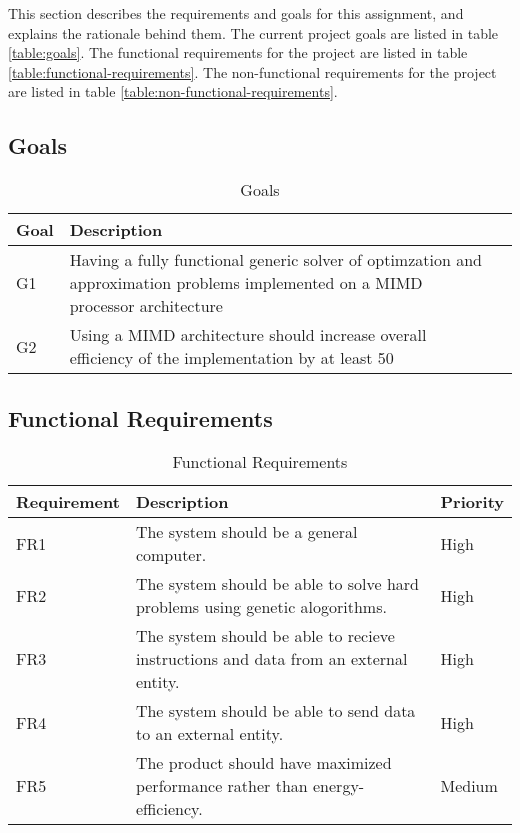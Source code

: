 This section describes the requirements and goals for this assignment, and explains the rationale behind them.
The current project goals are listed in table \vref{table:goals}.
The functional requirements for the project are listed in table \vref{table:functional-requirements}.
The non-functional requirements for the project are listed in table \vref{table:non-functional-requirements}.
\subsection{Goals}
\begin{table}[H]
 \begin{center}
 \begin{tabular}{| l | p{7cm} | l |}
 \hline
 Goal& Description\\
 \hline
 G1 & Having a fully functional generic solver of optimzation and approximation problems implemented on a MIMD processor architecture  \\
 G2 & Using a MIMD architecture should increase overall efficiency of the implementation by at least 50\\%
 \hline
 \end{tabular}
 \caption{Goals}
 \label{table:goals}
 \end{center}
 \end{table}
 \subsection{Functional Requirements}

 \begin{table}[H]
 \begin{center}
 \begin{tabular}{| l | p{7cm} | l |}
 \hline
 Requirement & Description & Priority\\
 \hline
 FR1 & The system should be a general computer. & High \\
 FR2 & The system should be able to solve hard problems using genetic alogorithms. & High \\
 FR3 & The system should be able to recieve instructions and data from an external entity. & High \\
 FR4 & The system should be able to send data to an external entity. & High \\
 FR5 & The product should have maximized performance rather than energy-efficiency. & Medium \\
 \hline
 \end{tabular}
 \caption{Functional Requirements}
 \label{table:functional-requirements}
 \end{center}
 \end{table}

